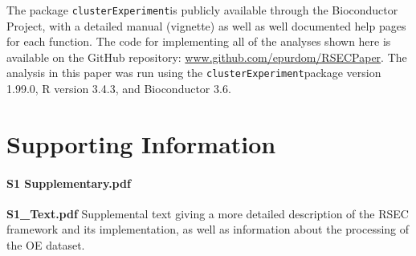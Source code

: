 \documentclass[10pt,letterpaper]{article}
\newcommand{\f}[1]{\texttt{#1}}
\newcommand{\CE}{\f{clusterExperiment}}
\begin{document}
The package \CE is publicly available through the Bioconductor Project, with a detailed manual (vignette) as well as well documented help pages for each function. The code for implementing all of the analyses shown here is available on the GitHub repository: \url{www.github.com/epurdom/RSECPaper}. The analysis in this paper was run using the \CE package version 1.99.0, R version 3.4.3, and Bioconductor 3.6.

\nolinenumbers

\section*{Supporting Information}


\paragraph*{S1 Supplementary.pdf}
\label{S1_File}
{\bf S1\_Text.pdf}  Supplemental text giving a more detailed description of the RSEC framework and its implementation, as well as information about the processing of the OE dataset. 
%


\end{document}
